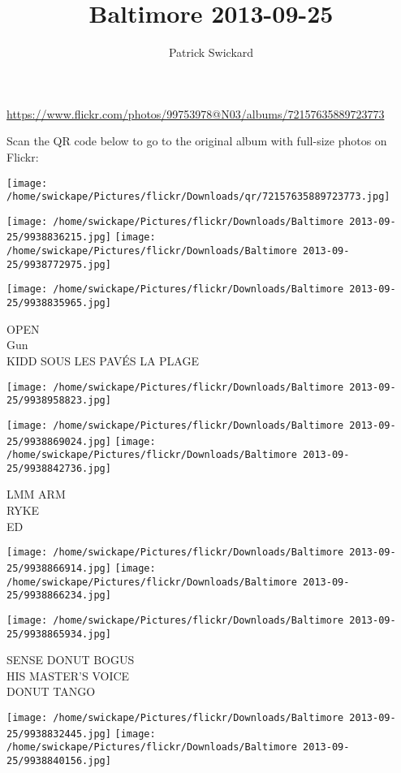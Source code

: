 \documentclass[10pt,letterpaper]{article}
\title{Baltimore 2013-09-25}
\author{Patrick Swickard}
\date{}
\begin{document}
\maketitle

\url{https://www.flickr.com/photos/99753978@N03/albums/72157635889723773}

Scan the QR code below to go to the original album with full-size photos on Flickr:

\texttt{[image: /home/swickape/Pictures/flickr/Downloads/qr/72157635889723773.jpg]}
\pagebreak

\texttt{[image: /home/swickape/Pictures/flickr/Downloads/Baltimore 2013-09-25/9938836215.jpg]}
\texttt{[image: /home/swickape/Pictures/flickr/Downloads/Baltimore 2013-09-25/9938772975.jpg]}

\vspace{0.25in}
\texttt{[image: /home/swickape/Pictures/flickr/Downloads/Baltimore 2013-09-25/9938835965.jpg]}

OPEN\\
Gun\\
KIDD SOUS LES PAVÉS LA PLAGE
\pagebreak

\texttt{[image: /home/swickape/Pictures/flickr/Downloads/Baltimore 2013-09-25/9938958823.jpg]}

\vspace{0.25in}
\texttt{[image: /home/swickape/Pictures/flickr/Downloads/Baltimore 2013-09-25/9938869024.jpg]}
\texttt{[image: /home/swickape/Pictures/flickr/Downloads/Baltimore 2013-09-25/9938842736.jpg]}

LMM ARM\\
RYKE\\
ED
\pagebreak

\texttt{[image: /home/swickape/Pictures/flickr/Downloads/Baltimore 2013-09-25/9938866914.jpg]}
\texttt{[image: /home/swickape/Pictures/flickr/Downloads/Baltimore 2013-09-25/9938866234.jpg]}

\vspace{0.25in}
\texttt{[image: /home/swickape/Pictures/flickr/Downloads/Baltimore 2013-09-25/9938865934.jpg]}

SENSE DONUT BOGUS\\
HIS MASTER'S VOICE\\
DONUT TANGO
\pagebreak

\texttt{[image: /home/swickape/Pictures/flickr/Downloads/Baltimore 2013-09-25/9938832445.jpg]}
\texttt{[image: /home/swickape/Pictures/flickr/Downloads/Baltimore 2013-09-25/9938840156.jpg]}
\end{document}
